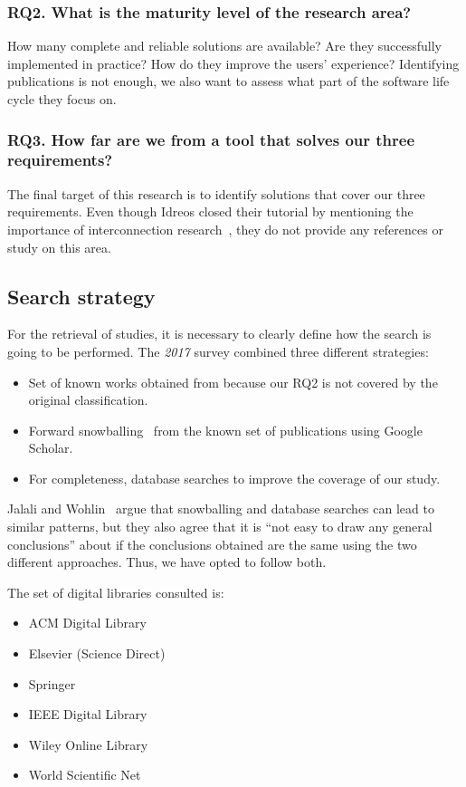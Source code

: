 \subsubsection{RQ2. What is the maturity level of the research area?}
How many complete and reliable solutions are available?
Are they successfully implemented in practice?
How do they improve the users' experience? Identifying publications is not enough,
we also want to assess what part of the software life cycle they focus on.

\subsubsection{RQ3. How far are we from a tool that solves our three requirements?}
The final target of this research is to identify solutions that cover our three
requirements.
Even though Idreos closed their tutorial by
mentioning the importance of interconnection research~\cite{Idreos2015}, they do not provide any references or study on this area.

\subsection{Search strategy}
\label{sec:mapping/search_strategy}

For the retrieval of studies, it is necessary to clearly define
how the search is going to be performed. The \emph{2017} survey combined
three different strategies:

\begin{itemize}
  \item Set of known works obtained from \cite{Idreos2015} because our RQ2 is
    not covered by the original classification.
  \item Forward snowballing~\cite{Webster2002} from the known set of publications using Google Scholar.
  \item For completeness, database searches to improve the coverage of our study.
\end{itemize}

Jalali and Wohlin~\cite{Jalali2012} argue that snowballing and database searches
can lead to similar patterns, but they also agree that it is
``not easy to draw any general conclusions'' about if the conclusions obtained are the same
using the two different approaches. Thus, we have opted to follow both.

The set of digital libraries consulted is:

\begin{itemize}
  \item ACM Digital Library
  \item Elsevier (Science Direct)
  \item Springer
  \item IEEE Digital Library
  \item Wiley Online Library
  \item World Scientific Net
\end{itemize}

